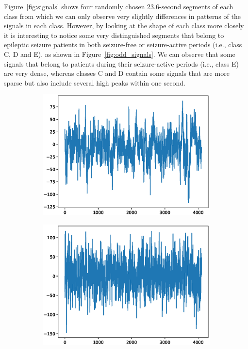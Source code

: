 \documentclass[12pt]{article}
\begin{document}
Figure~\ref{fig:signals} shows four randomly chosen 23.6-second segments of each class from which we can only observe very slightly differences in patterns of the signals in each class. However, by looking at the shape of each class more closely it is interesting to notice some very distinguished segments that belong to epileptic seizure patients in both seizure-free or seizure-active periods (i.e., class C, D and E), as shown in Figure~\ref{fig:odd_signals}. We can observe that some signals that belong to patients during their seizure-active periods (i.e., class E) are very dense, whereas classes C and D contain some signals that are more sparse but also include several high peaks within one second.

\begin{figure}
\begin{subfigure}{.25\textwidth}
  \centering
  \includegraphics[width=.8\linewidth]{figures/signals/A/Z015.eps}
\end{subfigure}%
\begin{subfigure}{.25\textwidth}
  \centering
  \includegraphics[width=.8\linewidth]{figures/signals/A/Z024.eps}

\end{subfigure}
\end{figure}
\end{document}
